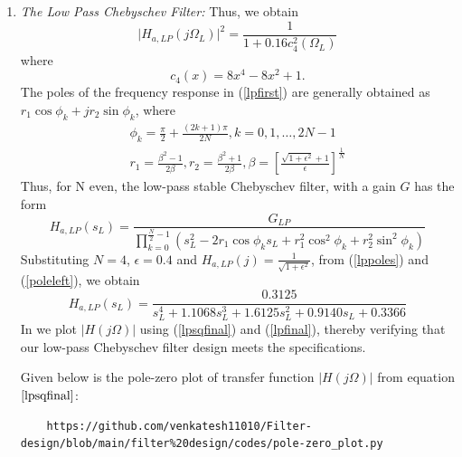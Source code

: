 \documentclass{article}
\begin{document}
\begin{enumerate}
\item {\em The Low Pass Chebyschev Filter:} Thus, we obtain
\begin{equation}
\label{lpsqfinal}
\vert H_{a,LP}(j\Omega_L)\vert^2 = \frac{1}{1 + 0.16c_4^2(\Omega_L)} 
\end{equation}
where
\begin{equation}
c_4(x) = 8x^4 - 8x^2 + 1.	
\end{equation}
The poles of the frequency response in (\ref{lpfirst}) are generally obtained as 
$r_1\cos\phi_k + jr_2\sin \phi_k$, where
\begin{eqnarray}
\label{lppoles}
\phi_k = \frac{\pi}{2} + \frac{(2k+1)\pi}{2N}, k = 0, 1, \dots, 2N-1 \nonumber \\
r_1 = \frac{\beta^2 - 1}{2\beta}, r_2 = \frac{\beta^2 + 1}{2\beta}, \beta = \left[ \frac{\sqrt{1 + \epsilon^2} + 1}{\epsilon}\right]^{\frac{1}{N}}
\end{eqnarray}
Thus, for N even, the low-pass stable Chebyschev filter, with a gain $G$ has the form
\begin{equation}
\label{poleleft}
H_{a,LP}(s_L) = \frac{G_{LP}}{\prod_{k = 0}^{\frac{N}{2}-1}(s_L^2 - 2r_1\cos\phi_ks_L + r_1^2\cos^2\phi_k + r_2^2 \sin^2\phi_k)}
\end{equation}
Substituting $N = 4$, $\epsilon = 0.4$ and $H_{a,LP}(j) = \frac{1}{\sqrt{1+\epsilon^2}}$, from (\ref{lppoles}) and (\ref{poleleft}), we obtain 
\begin{equation}
\label{lpfinal}
H_{a,LP}(s_L) = \frac{0.3125}{s_L^4 + 1.1068s_L^3 + 1.6125s_L^2+0.9140s_L + 0.3366}
\end{equation}
In  we plot $|H(j\Omega)|$ using (\ref{lpsqfinal}) and (\ref{lpfinal}), thereby verifying that our low-pass Chebyschev filter design meets the specifications.

Given below is the pole-zero plot of transfer function $|H(j\Omega)|$ from equation$\eqref{lpsqfinal}$:
\begin{lstlisting}
	https://github.com/venkatesh11010/Filter-design/blob/main/filter%20design/codes/pole-zero_plot.py
\end{lstlisting}


\end{enumerate}
\end{document}
